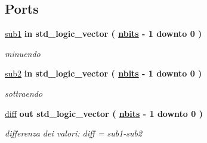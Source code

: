 \subsection*{Ports}
 \begin{DoxyCompactItemize}
\item 
\hyperlink{group___subtractor_ga49536ce3d87a5522d2d82cc34985d648}{sub1}  {\bfseries {\bfseries \textcolor{vhdlchar}{in}\textcolor{vhdlchar}{ }}} {\bfseries \textcolor{vhdlchar}{std\+\_\+logic\+\_\+vector}\textcolor{vhdlchar}{ }\textcolor{vhdlchar}{(}\textcolor{vhdlchar}{ }\textcolor{vhdlchar}{ }\textcolor{vhdlchar}{ }\textcolor{vhdlchar}{ }{\bfseries \hyperlink{group___subtractor_gae1435c07d0cd54b521535e2f8de6f94e}{nbits}} \textcolor{vhdlchar}{-\/}\textcolor{vhdlchar}{ } \textcolor{vhdldigit}{1} \textcolor{vhdlchar}{ }\textcolor{vhdlchar}{downto}\textcolor{vhdlchar}{ }\textcolor{vhdlchar}{ } \textcolor{vhdldigit}{0} \textcolor{vhdlchar}{ }\textcolor{vhdlchar}{)}\textcolor{vhdlchar}{ }} 
\begin{DoxyCompactList}\small\item\em minuendo \end{DoxyCompactList}\item 
\hyperlink{group___subtractor_ga0c49fa677895a036f45dd76f988d18c5}{sub2}  {\bfseries {\bfseries \textcolor{vhdlchar}{in}\textcolor{vhdlchar}{ }}} {\bfseries \textcolor{vhdlchar}{std\+\_\+logic\+\_\+vector}\textcolor{vhdlchar}{ }\textcolor{vhdlchar}{(}\textcolor{vhdlchar}{ }\textcolor{vhdlchar}{ }\textcolor{vhdlchar}{ }\textcolor{vhdlchar}{ }{\bfseries \hyperlink{group___subtractor_gae1435c07d0cd54b521535e2f8de6f94e}{nbits}} \textcolor{vhdlchar}{-\/}\textcolor{vhdlchar}{ } \textcolor{vhdldigit}{1} \textcolor{vhdlchar}{ }\textcolor{vhdlchar}{downto}\textcolor{vhdlchar}{ }\textcolor{vhdlchar}{ } \textcolor{vhdldigit}{0} \textcolor{vhdlchar}{ }\textcolor{vhdlchar}{)}\textcolor{vhdlchar}{ }} 
\begin{DoxyCompactList}\small\item\em sottraendo \end{DoxyCompactList}\item 
\hyperlink{group___subtractor_ga0fa68103d429fdc11539b6baa81d0d0d}{diff}  {\bfseries {\bfseries \textcolor{vhdlchar}{out}\textcolor{vhdlchar}{ }}} {\bfseries \textcolor{vhdlchar}{std\+\_\+logic\+\_\+vector}\textcolor{vhdlchar}{ }\textcolor{vhdlchar}{(}\textcolor{vhdlchar}{ }\textcolor{vhdlchar}{ }\textcolor{vhdlchar}{ }\textcolor{vhdlchar}{ }{\bfseries \hyperlink{group___subtractor_gae1435c07d0cd54b521535e2f8de6f94e}{nbits}} \textcolor{vhdlchar}{-\/}\textcolor{vhdlchar}{ } \textcolor{vhdldigit}{1} \textcolor{vhdlchar}{ }\textcolor{vhdlchar}{downto}\textcolor{vhdlchar}{ }\textcolor{vhdlchar}{ } \textcolor{vhdldigit}{0} \textcolor{vhdlchar}{ }\textcolor{vhdlchar}{)}\textcolor{vhdlchar}{ }} 
\begin{DoxyCompactList}\small\item\em differenza dei valori\+: diff = sub1-\/sub2 \end{DoxyCompactList}\end{DoxyCompactItemize}


